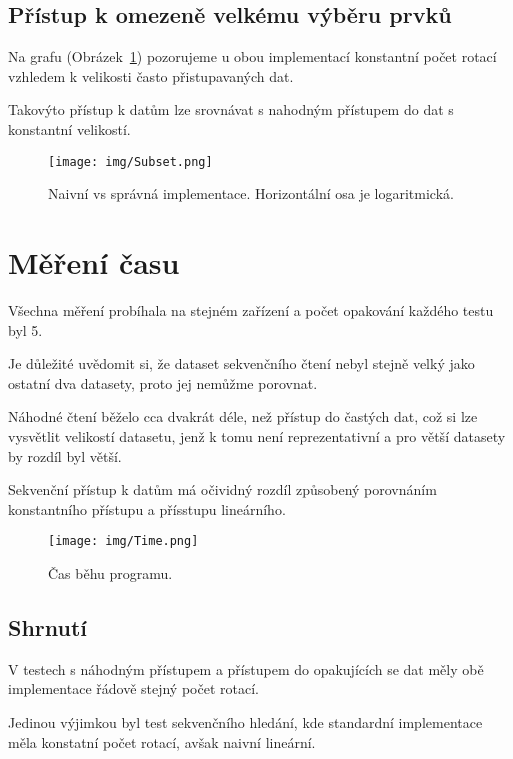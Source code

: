\documentclass[a4paper]{article}
\begin{document}
	\pagebreak
	\subsection{Přístup k omezeně velkému výběru prvků}
	Na grafu (Obrázek~\ref{fig:1_subset}) pozorujeme u obou implementací konstantní počet rotací vzhledem k velikosti často přistupavaných dat.

	Takovýto přístup k datům lze srovnávat s nahodným přístupem do dat s konstantní velikostí. 
	\begin{figure}[H]
		\centering
		\texttt{[image: img/Subset.png]}
        \caption{Naivní vs správná implementace. Horizontální osa je logaritmická.}
		\label{fig:1_subset}
	\end{figure}

	
	\pagebreak
	\section{Měření času}

  	Všechna měření probíhala na stejném zařízení a počet opakování každého testu byl 5.

	Je důležité uvědomit si, že dataset sekvenčního čtení nebyl stejně velký jako ostatní dva datasety, proto jej nemůžme porovnat.

	Náhodné čtení běželo cca dvakrát déle, než přístup do častých dat, což si lze vysvětlit velikostí datasetu, jenž k tomu není reprezentativní a
	pro větší datasety by rozdíl byl větší.

	Sekvenční přístup k datům má očividný rozdíl způsobený porovnáním konstantního přístupu a přísstupu lineárního.	

    \begin{figure}[H]
		\centering
		\texttt{[image: img/Time.png]}
		\caption{Čas běhu programu.}
		\label{fig:1_time}
	\end{figure}

	
	\subsection{Shrnutí}

	V testech s náhodným přístupem a přístupem do opakujících se dat měly obě implementace řádově stejný počet rotací.

	Jedinou výjimkou byl test sekvenčního hledání, kde standardní implementace měla konstatní počet rotací, avšak naivní lineární.
\end{document}
